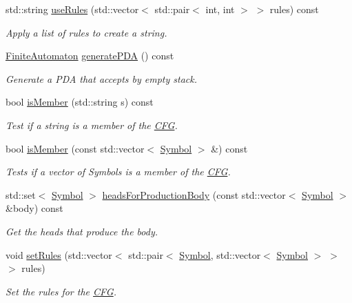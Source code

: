 \begin{DoxyCompactItemize}
std\-::string \hyperlink{class_c_f_g_acba40d8b10d18c6bd51c639a44aa343a}{use\-Rules} (std\-::vector$<$ std\-::pair$<$ int, int $>$ $>$ rules) const 
\begin{DoxyCompactList}\small\item\em \-Apply a list of rules to create a string. \end{DoxyCompactList}\item 
\hyperlink{class_finite_automaton}{\-Finite\-Automaton} \hyperlink{class_c_f_g_adae376cdf230547cc7b5d342aa9d0109}{generate\-P\-D\-A} () const 
\begin{DoxyCompactList}\small\item\em \-Generate a \-P\-D\-A that accepts by empty stack. \end{DoxyCompactList}\item 
bool \hyperlink{class_c_f_g_ae6cbc12ca5206370ed5b87cfea741a03}{is\-Member} (std\-::string s) const 
\begin{DoxyCompactList}\small\item\em \-Test if a string is a member of the \hyperlink{class_c_f_g}{\-C\-F\-G}. \end{DoxyCompactList}\item 
bool \hyperlink{class_c_f_g_afff1ac4ecf5e09206a0a5081dc2ab3eb}{is\-Member} (const std\-::vector$<$ \hyperlink{class_symbol}{\-Symbol} $>$ \&) const 
\begin{DoxyCompactList}\small\item\em \-Tests if a vector of \-Symbols is a member of the \hyperlink{class_c_f_g}{\-C\-F\-G}. \end{DoxyCompactList}\item 
std\-::set$<$ \hyperlink{class_symbol}{\-Symbol} $>$ \hyperlink{class_c_f_g_a8dc1412978ccd2a1744004525bf8bb9c}{heads\-For\-Production\-Body} (const std\-::vector$<$ \hyperlink{class_symbol}{\-Symbol} $>$ \&body) const 
\begin{DoxyCompactList}\small\item\em \-Get the heads that produce the body. \end{DoxyCompactList}\item 
void \hyperlink{class_c_f_g_a6c0b5439044e9a3e152e49ebcbfd68e3}{set\-Rules} (std\-::vector$<$ std\-::pair$<$ \hyperlink{class_symbol}{\-Symbol}, std\-::vector$<$ \hyperlink{class_symbol}{\-Symbol} $>$ $>$ $>$ rules)
\begin{DoxyCompactList}\small\item\em \-Set the rules for the \hyperlink{class_c_f_g}{\-C\-F\-G}. \end{DoxyCompactList}\item 

\end{DoxyCompactItemize}
